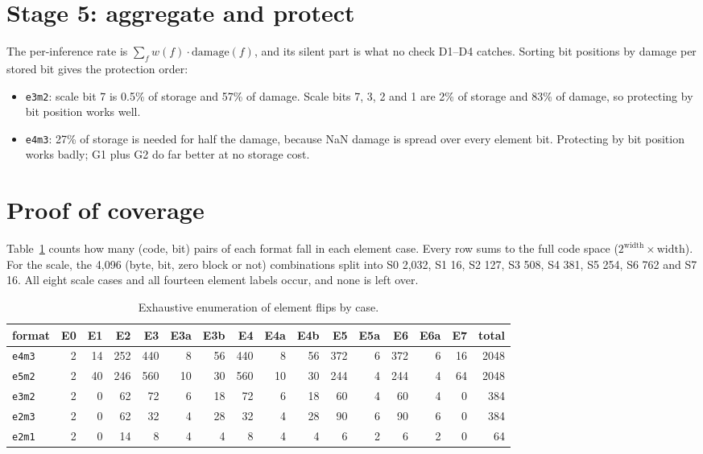 \documentclass[10pt,a4paper]{article}
\newcommand{\fmt}[1]{\texttt{#1}}
\begin{document}
\section{Stage 5: aggregate and protect}

The per-inference rate is $\sum_f w(f)\cdot\text{damage}(f)$, and its silent part is what no
check D1--D4 catches. Sorting bit positions by damage per stored bit gives the protection order:
\begin{itemize}
  \item \fmt{e3m2}: scale bit 7 is 0.5\% of storage and 57\% of damage. Scale bits 7, 3, 2 and 1
        are 2\% of storage and 83\% of damage, so protecting by bit position works well.
  \item \fmt{e4m3}: 27\% of storage is needed for half the damage, because NaN damage is spread
        over every element bit. Protecting by bit position works badly; G1 plus G2 do far better
        at no storage cost.
\end{itemize}

\section{Proof of coverage}

Table~\ref{tab:coverage} counts how many (code, bit) pairs of each format fall in each element
case. Every row sums to the full code space ($2^{\text{width}}\times\text{width}$). For the scale,
the 4,096 (byte, bit, zero block or not) combinations split into S0 2,032, S1 16, S2 127, S3 508,
S4 381, S5 254, S6 762 and S7 16. All eight scale cases and all fourteen element labels occur,
and none is left over.

\begin{table}[h]
\centering
\caption{Exhaustive enumeration of element flips by case.}
\label{tab:coverage}
\small\setlength{\tabcolsep}{2.6pt}
\begin{tabular}{lrrrrrrrrrrrrrrr}
\toprule
format & E0 & E1 & E2 & E3 & E3a & E3b & E4 & E4a & E4b & E5 & E5a & E6 & E6a & E7 & total \\
\midrule
\fmt{e4m3} & 2 & 14 & 252 & 440 & 8 & 56 & 440 & 8 & 56 & 372 & 6 & 372 & 6 & 16 & 2048 \\
\fmt{e5m2} & 2 & 40 & 246 & 560 & 10 & 30 & 560 & 10 & 30 & 244 & 4 & 244 & 4 & 64 & 2048 \\
\fmt{e3m2} & 2 & 0 & 62 & 72 & 6 & 18 & 72 & 6 & 18 & 60 & 4 & 60 & 4 & 0 & 384 \\
\fmt{e2m3} & 2 & 0 & 62 & 32 & 4 & 28 & 32 & 4 & 28 & 90 & 6 & 90 & 6 & 0 & 384 \\
\fmt{e2m1} & 2 & 0 & 14 & 8 & 4 & 4 & 8 & 4 & 4 & 6 & 2 & 6 & 2 & 0 & 64 \\
\bottomrule
\end{tabular}
\end{table}
\end{document}
